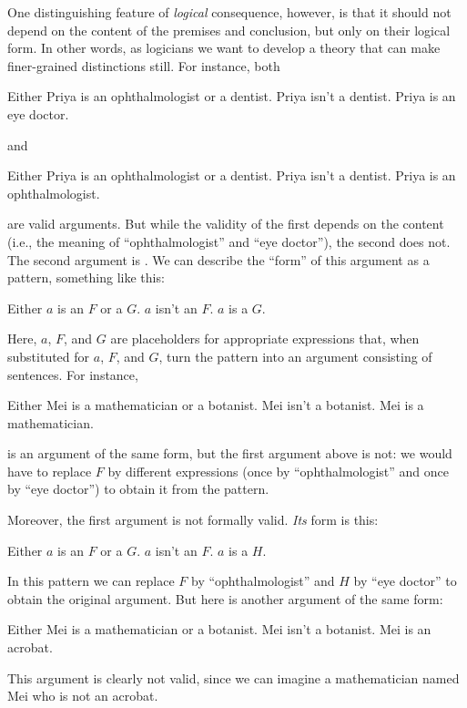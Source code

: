 One distinguishing feature of \emph{logical} consequence, however, is that it should not depend on the content of the premises and conclusion, but only on their logical form. In other words, as logicians we want to develop a theory that can make finer-grained distinctions still. For instance, both
\begin{earg}
	\prem Either Priya is an ophthalmologist or a dentist.
	\prem Priya isn't a dentist.
	\conc Priya is an eye doctor.
\end{earg}
and
\begin{earg}
	\prem Either Priya is an ophthalmologist or a dentist.
	\prem Priya isn't a dentist.
	\conc Priya is an ophthalmologist.
\end{earg}
are valid arguments. But while the validity of the first depends on the content (i.e., the meaning of ``ophthalmologist'' and ``eye doctor''), the second does not. The second argument is . We can describe the ``form'' of this argument as a pattern, something like this:
\begin{earg}
	\prem Either $a$ is an $F$ or a $G$.
	\prem $a$ isn't an $F$.
	\conc $a$ is a $G$.
\end{earg}
Here, $a$, $F$, and $G$ are placeholders for appropriate expressions that, when substituted for $a$, $F$, and $G$, turn the pattern into an argument consisting of sentences. For instance,
\begin{earg}
	\prem Either Mei is a mathematician or a botanist.
	\prem Mei isn't a botanist.
	\conc Mei is a mathematician.
\end{earg}
is an argument of the same form, but the first argument above is not: we would have to replace $F$ by different expressions (once by ``ophthalmologist'' and once by ``eye doctor'') to obtain it from the pattern.

Moreover, the first argument is not formally valid. \emph{Its} form is this:
\begin{earg}
	\prem Either $a$ is an $F$ or a $G$.
	\prem $a$ isn't an $F$.
	\conc $a$ is a $H$.
\end{earg}
In this pattern we can replace $F$ by ``ophthalmologist'' and $H$ by ``eye doctor'' to obtain the original argument.  But here is another argument of the same form:
\begin{earg}
	\prem Either Mei is a mathematician or a botanist.
	\prem Mei isn't a botanist.
	\conc Mei is an acrobat.
\end{earg}
This argument is clearly not valid, since we can imagine a mathematician named Mei who is not an acrobat.

